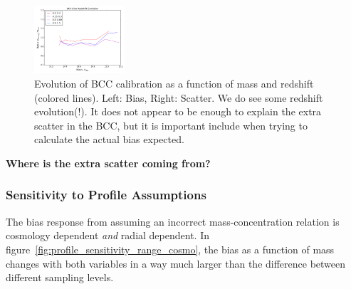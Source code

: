 \documentclass[11pt]{article}
\begin{document}
\begin{figure}
\includegraphics[width=0.3\textwidth]{figures/bcc_bias_redshift_evo_r10_n0_0}
\caption{Evolution of BCC calibration as a function of mass and redshift (colored lines). Left: Bias, Right: Scatter. We do see some redshift evolution(!). It does not appear to be enough to explain the extra scatter in the BCC, but it is important include when trying to calculate the actual bias expected.}
\label{fig:bcc_bias_redshift_evo}
\end{figure}

\textbf{Where is the extra scatter coming from?}

\subsubsection{Sensitivity to Profile Assumptions}

The bias response from assuming an incorrect mass-concentration relation is cosmology dependent \emph{and} radial dependent. In figure~\ref{fig:profile_sensitivity_range_cosmo}, the bias as a function of mass changes with both variables in a way much larger than the difference between different sampling levels.
\end{document}
